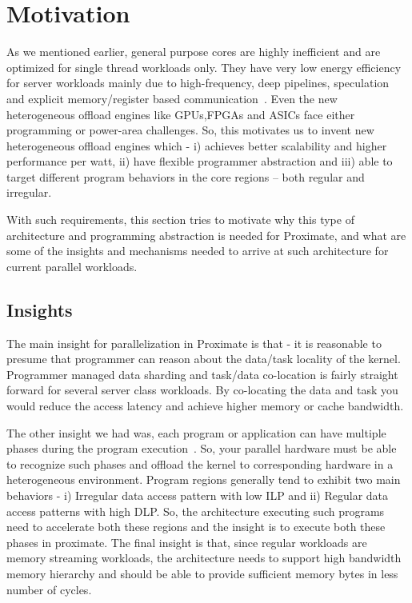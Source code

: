 \section{Motivation} \label{sec:motiv}

As we mentioned earlier, general purpose cores are highly inefficient 
and are optimized for single thread workloads only. They have very low energy efficiency
for server workloads mainly due to high-frequency, deep  pipelines, speculation
and explicit memory/register based communication~\cite{gpp_innef}.
Even the new heterogeneous offload engines like GPUs,FPGAs and ASICs face either 
programming or power-area challenges. So, this motivates us to
invent new heterogeneous offload engines which - i) achieves better scalability
and higher performance per watt, ii) have flexible programmer abstraction and
iii) able to target different program behaviors in the core regions -- both regular and irregular.  

With such requirements, this section tries to motivate why this type of architecture and programming abstraction
is needed for Proximate, and what are some of the insights and mechanisms needed to arrive 
at such architecture for current parallel workloads. 

\subsection{Insights}
The main insight for parallelization in Proximate is that - it
is reasonable to presume that programmer can reason about the
data/task locality of the kernel. Programmer managed data sharding
and task/data co-location is fairly straight forward for several server class
workloads. 
By co-locating the data and task you would reduce the access latency and 
achieve higher memory or cache bandwidth. 

The other insight we had was, each program or application can have multiple phases
during the program execution~\cite{nowatzki2016analyzing}. So, your
parallel hardware must be able to recognize such phases and offload the kernel to
corresponding hardware in a heterogeneous environment. Program regions generally tend to 
exhibit two main behaviors - i) Irregular data access pattern with low ILP and
ii) Regular data access patterns with high DLP. So, the architecture executing such programs need to
accelerate both these regions and the insight is to execute both these phases in proximate.
The final insight is that, since regular workloads are memory streaming workloads, the architecture needs
to support high bandwidth memory hierarchy and should be able to provide sufficient memory bytes in less number of cycles. 


